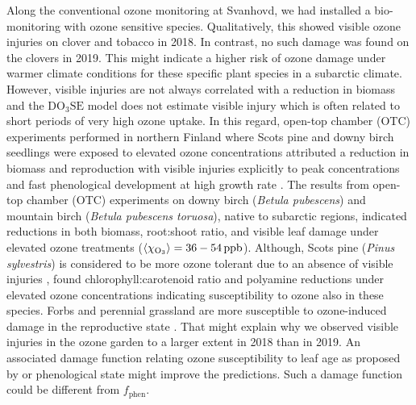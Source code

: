 \documentclass[bg, manuscript]{copernicus}
\begin{document}
Along the conventional ozone monitoring at Svanhovd, we had installed a bio-monitoring with ozone sensitive species. Qualitatively, this showed visible ozone injuries on clover and tobacco in 2018. In contrast, no such damage was found on the clovers in 2019. This might indicate a higher risk of ozone damage under warmer climate conditions for these specific plant species in a subarctic climate. However, visible injuries are not always correlated with a reduction in biomass \citep[and citations therein]{CRG:Felzer2007} and the $\mathrm{DO_3SE}$ model does not estimate visible injury which is often related to short periods of very high ozone uptake. In this regard, open-top chamber (OTC) experiments performed in northern Finland where Scots pine and downy birch seedlings were exposed to elevated ozone concentrations attributed a reduction in biomass and reproduction with visible injuries explicitly to peak  concentrations and fast phenological development at high growth rate \citep{Amb:Manninen2009}. The \citet{Amb:Manninen2009} results from open-top chamber (OTC) experiments on downy birch (\emph{Betula pubescens}) and mountain birch (\emph{Betula pubescens toruosa}), native to subarctic regions, indicated reductions in both biomass, root:shoot ratio, and visible leaf damage under elevated ozone treatments ($\left<\chem{\chi_{O_3}}\right> = 36-54\,\unit{ppb}$). Although, Scots pine (\emph{Pinus sylvestris}) is considered to be more ozone tolerant due to an absence of visible injuries \citep{Amb:Girgzdiene2009}, \citet{Amb:Manninen2009} found chlorophyll:carotenoid ratio and polyamine reductions under elevated ozone concentrations indicating susceptibility to ozone also in these species. Forbs and perennial grassland are more susceptible to ozone-induced damage in the reproductive state \citep{EP:Bassin2004}. 
That might explain why we observed visible injuries in the ozone garden to a larger extent in 2018 than in 2019. An associated damage function relating ozone susceptibility to leaf age as proposed by \citet{AE:Musselman2006} or phenological state might improve the predictions. Such a damage function could be different from $f_\mathrm{phen}$.
\end{document}
